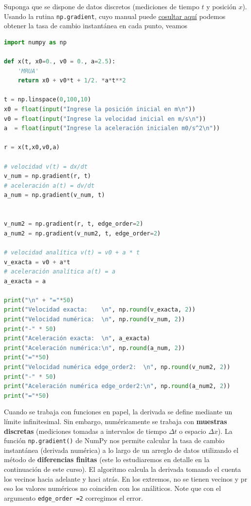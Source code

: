 \documentclass[12pt]{article}
\begin{document}
Suponga que se dispone  de datos discretos 
(mediciones de tiempo $t$ y posición $x$). Usando la rutina 
 \texttt{np.gradient}, cuyo manual puede 
 \href{https://numpy.org/doc/stable/reference/generated/numpy.gradient.html}{cosultar aquí}
 podemos obtener la tasa de cambio instantánea en cada punto, veamos
%
\begin{lstlisting}[language=Python, captionpos=t, title=\texttt{derivada\_MRUA.py}]
import numpy as np

def x(t, x0=0., v0 = 0., a=2.5):
    'MRUA'
    return x0 + v0*t + 1/2. *a*t**2 

t = np.linspace(0,100,10)
x0 = float(input("Ingrese la posición inicial en m\n"))
v0 = float(input("Ingrese la velocidad inicial en m/s\n"))
a  = float(input("Ingrese la aceleración inicialen m0/s^2\n"))

r = x(t,x0,v0,a)

# velocidad v(t) = dx/dt
v_num = np.gradient(r, t)
# aceleración a(t) = dv/dt 
a_num = np.gradient(v_num, t)


v_num2 = np.gradient(r, t, edge_order=2)
a_num2 = np.gradient(v_num2, t, edge_order=2)

# velocidad analítica v(t) = v0 + a * t 
v_exacta = v0 + a*t
# aceleración analítica a(t) = a 
a_exacta = a    

print("\n" + "="*50)
print("Velocidad exacta:    \n", np.round(v_exacta, 2))
print("Velocidad numérica:  \n", np.round(v_num, 2))
print("-" * 50)
print("Aceleración exacta:  \n", a_exacta)
print("Aceleración numérica:\n", np.round(a_num, 2))
print("="*50)
print("Velocidad numérica edge_order2:  \n", np.round(v_num2, 2))
print("-" * 50)
print("Aceleración numérica edge_order2:\n", np.round(a_num2, 2))
print("="*50)
\end{lstlisting}
%  
Cuando se trabaja con funciones en papel, la derivada se define 
mediante un límite infinitesimal. Sin embargo, numéricamente se trabaja con 
\textbf{muestras discretas} 
(mediciones tomadas a intervalos de tiempo $\Delta t$ o espacio $\Delta x$).
La función \texttt{np.gradient()} de NumPy nos permite calcular la tasa de 
cambio instantánea (derivada numérica) a lo largo de un arreglo 
de datos utilizando el método de \textbf{diferencias finitas} (este lo 
estudiaremos en detalle en la continuación de este curso). El algoritmo calcula 
la derivada tomando el cuenta los vecinos hacia adelante y haci atrás. En los extremos,
no se tienen vecinos y pr eso los valores numéricos no coinciden con los análiticos.
Note que con el argumento \lstinline|edge_order =2| corregimos el error.
\end{document}
